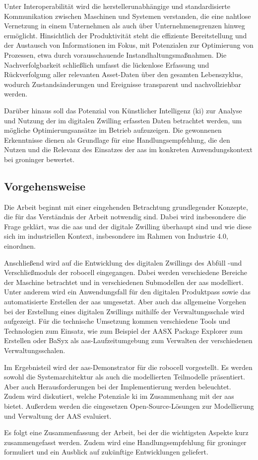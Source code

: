 Unter Interoperabilität wird die herstellerunabhängige und standardisierte Kommunikation zwischen Maschinen und Systemen verstanden, die eine nahtlose Vernetzung in einem Unternehmen als auch über Unternehmensgrenzen hinweg ermöglicht.
Hinsichtlich der Produktivität steht die effiziente Bereitstellung und der Austausch von Informationen im Fokus, mit Potenzialen zur Optimierung von Prozessen, etwa durch vorausschauende Instandhaltungsmaßnahmen. 
Die Nachverfolgbarkeit schließlich umfasst die lückenlose Erfassung und Rückverfolgung aller relevanten Asset-Daten über den gesamten Lebenszyklus, wodurch Zustandsänderungen und Ereignisse transparent und nachvollziehbar werden.

Darüber hinaus soll das Potenzial von Künstlicher Intelligenz (\acs{ki}) zur Analyse und Nutzung der im digitalen Zwilling erfassten Daten betrachtet werden, um mögliche Optimierungsansätze im Betrieb aufzuzeigen.
Die gewonnenen Erkenntnisse dienen als Grundlage für eine Handlungsempfehlung, die den Nutzen und die Relevanz des Einsatzes der \acs{aas} im konkreten Anwendungskontext bei groninger bewertet.

\subsection{Vorgehensweise}
Die Arbeit beginnt mit einer eingehenden Betrachtung grundlegender Konzepte, die für das Verständnis der Arbeit notwendig sind. 
Dabei wird insbesondere die Frage geklärt, was die \acs{aas} und der digitale Zwilling überhaupt sind und wie diese sich im industriellen Kontext, insbesondere im Rahmen von Industrie 4.0, einordnen.

Anschließend wird auf die Entwicklung des digitalen Zwillings des Abfüll -und Verschließmoduls der robocell eingegangen. 
Dabei werden verschiedene Bereiche der Maschine betrachtet und in verschiedenen Submodellen der \acs{aas} modelliert.
Unter anderem wird ein Anwendungsfall für den digitalen Produktpass sowie das automatisierte Erstellen der \acs{aas} umgesetzt.
Aber auch das allgemeine Vorgehen bei der Erstellung eines digitalen Zwillings mithilfe der Verwaltungsschale wird aufgezeigt.
Für die technische Umsetzung kommen verschiedene Tools und Technologien zum Einsatz, wie zum Beispiel der AASX Package Explorer zum Erstellen oder BaSyx als \acs{aas}-Laufzeitumgebung zum Verwalten der verschiedenen Verwaltungsschalen.

Im Ergebnisteil wird der \acs{aas}-Demonstrator für die robocell vorgestellt. Es werden sowohl die Systemarchitektur als auch die modellierten Teilmodelle präsentiert.
Aber auch Herausforderungen bei der Implementierung werden beleuchtet.
Zudem wird diskutiert, welche Potenziale \ac{ki} im Zusammenhang mit der \acs{aas} bietet.
Außerdem werden die eingesetzen Open-Source-Lösungen zur Modellierung und Verwaltung der AAS evaluiert.

Es folgt eine Zusammenfassung der Arbeit, bei der die wichtigsten Aspekte kurz zusammengefasst werden.
Zudem wird eine Handlungsempfehlung für groninger formuliert und ein Ausblick auf zukünftige Entwicklungen geliefert.